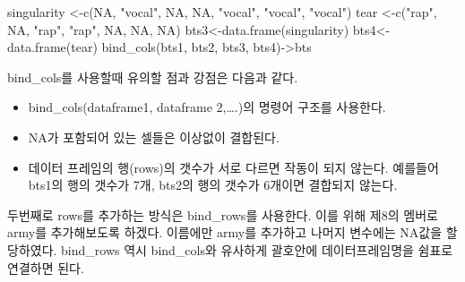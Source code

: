 \documentclass[
]{book}
\newenvironment{Shaded}{\begin{snugshade}}{\end{snugshade}}
\newcommand{\ConstantTok}[1]{\textcolor[rgb]{0.00,0.00,0.00}{#1}}
\newcommand{\FunctionTok}[1]{\textcolor[rgb]{0.00,0.00,0.00}{#1}}
\newcommand{\NormalTok}[1]{#1}
\newcommand{\OtherTok}[1]{\textcolor[rgb]{0.56,0.35,0.01}{#1}}
\newcommand{\StringTok}[1]{\textcolor[rgb]{0.31,0.60,0.02}{#1}}
\providecommand{\tightlist}{%
  \setlength{\itemsep}{0pt}\setlength{\parskip}{0pt}}
\theoremstyle{definition}
\theoremstyle{definition}
\theoremstyle{definition}
\theoremstyle{definition}
\theoremstyle{remark}
\begin{document}
\begin{Shaded}
\begin{Highlighting}[]
\NormalTok{singularity }\OtherTok{\textless{}{-}}\FunctionTok{c}\NormalTok{(}\ConstantTok{NA}\NormalTok{, }\StringTok{"vocal"}\NormalTok{, }\ConstantTok{NA}\NormalTok{, }\ConstantTok{NA}\NormalTok{, }\StringTok{"vocal"}\NormalTok{, }\StringTok{"vocal"}\NormalTok{, }\StringTok{"vocal"}\NormalTok{)}
\NormalTok{tear }\OtherTok{\textless{}{-}}\FunctionTok{c}\NormalTok{(}\StringTok{"rap"}\NormalTok{, }\ConstantTok{NA}\NormalTok{, }\StringTok{"rap"}\NormalTok{, }\StringTok{"rap"}\NormalTok{, }\ConstantTok{NA}\NormalTok{, }\ConstantTok{NA}\NormalTok{, }\ConstantTok{NA}\NormalTok{)}
\NormalTok{bts3}\OtherTok{\textless{}{-}}\FunctionTok{data.frame}\NormalTok{(singularity)}
\NormalTok{bts4}\OtherTok{\textless{}{-}}\FunctionTok{data.frame}\NormalTok{(tear)}
\FunctionTok{bind\_cols}\NormalTok{(bts1, bts2, bts3, bts4)}\OtherTok{{-}\textgreater{}}\NormalTok{bts}
\end{Highlighting}
\end{Shaded}

bind\_cols를 사용할때 유의할 점과 강점은 다음과 같다.

\begin{itemize}
\tightlist
\item
  bind\_cols(dataframe1, dataframe 2,\ldots.)의 명령어 구조를 사용한다.
\item
  NA가 포함되어 있는 셀들은 이상없이 결합된다.
\item
  데이터 프레임의 행(rows)의 갯수가 서로 다르면 작동이 되지 않는다. 예를들어 bts1의 행의 갯수가 7개, bts2의 행의 갯수가 6개이면 결합되지 않는다.
\end{itemize}

두번째로 rows를 추가하는 방식은 bind\_rows를 사용한다. 이를 위해 제8의 멤버로 army를 추가해보도록 하겠다. 이름에만 army를 추가하고 나머지 변수에는 NA값을 할당하였다. bind\_rows 역시 bind\_cols와 유사하게 괄호안에 데이터프레임명을 쉼표로 연결하면 된다.
\end{document}
